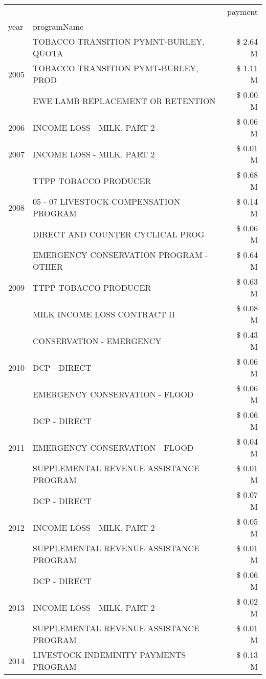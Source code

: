 \begin{tabular}{llr}
\toprule
 &  & payment \\
year & programName &  \\
\midrule
\multirow[t]{3}{*}{2005} & TOBACCO TRANSITION PYMNT-BURLEY, QUOTA & \$ 2.64 M \\
 & TOBACCO TRANSITION PYMT-BURLEY, PROD & \$ 1.11 M \\
 & EWE LAMB REPLACEMENT OR RETENTION & \$ 0.00 M \\
\cline{1-3}
2006 & INCOME LOSS - MILK, PART 2 & \$ 0.06 M \\
\cline{1-3}
2007 & INCOME LOSS - MILK, PART 2 & \$ 0.01 M \\
\cline{1-3}
\multirow[t]{3}{*}{2008} & TTPP TOBACCO PRODUCER & \$ 0.68 M \\
 & 05 - 07 LIVESTOCK COMPENSATION PROGRAM & \$ 0.14 M \\
 & DIRECT AND COUNTER CYCLICAL PROG & \$ 0.06 M \\
\cline{1-3}
\multirow[t]{3}{*}{2009} & EMERGENCY CONSERVATION PROGRAM - OTHER & \$ 0.64 M \\
 & TTPP TOBACCO PRODUCER & \$ 0.63 M \\
 & MILK INCOME LOSS CONTRACT II & \$ 0.08 M \\
\cline{1-3}
\multirow[t]{3}{*}{2010} & CONSERVATION - EMERGENCY & \$ 0.43 M \\
 & DCP - DIRECT & \$ 0.06 M \\
 & EMERGENCY CONSERVATION - FLOOD & \$ 0.06 M \\
\cline{1-3}
\multirow[t]{3}{*}{2011} & DCP - DIRECT & \$ 0.06 M \\
 & EMERGENCY CONSERVATION - FLOOD & \$ 0.04 M \\
 & SUPPLEMENTAL REVENUE ASSISTANCE PROGRAM & \$ 0.01 M \\
\cline{1-3}
\multirow[t]{3}{*}{2012} & DCP - DIRECT & \$ 0.07 M \\
 & INCOME LOSS - MILK, PART 2 & \$ 0.05 M \\
 & SUPPLEMENTAL REVENUE ASSISTANCE PROGRAM & \$ 0.01 M \\
\cline{1-3}
\multirow[t]{3}{*}{2013} & DCP - DIRECT & \$ 0.06 M \\
 & INCOME LOSS - MILK, PART 2 & \$ 0.02 M \\
 & SUPPLEMENTAL REVENUE ASSISTANCE PROGRAM & \$ 0.01 M \\
\cline{1-3}
\multirow[t]{3}{*}{2014} & LIVESTOCK INDEMINITY PAYMENTS PROGRAM & \$ 0.13 M \\

\end{tabular}
